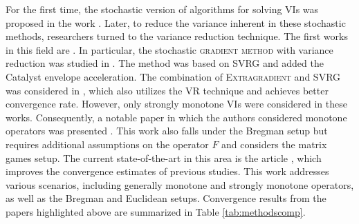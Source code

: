 \documentclass{article}
\begin{document}
For the first time, the stochastic version of algorithms for solving VIs was proposed in the work \citep{juditsky2011solving}. Later, to reduce the variance inherent in these stochastic methods, researchers turned to the variance reduction technique. The first works in this field are \citep{palaniappan2016stochastic, chavdarova2019reducing}. In particular, the stochastic \textsc{gradient method} with variance reduction was studied in \citep{palaniappan2016stochastic}. The method was based on \textsc{SVRG} \citep{johnson2013accelerating} and added the Catalyst envelope acceleration. The combination of \textsc{Extragradient} and \textsc{SVRG} was considered in \citep{chavdarova2019reducing}, which also utilizes the VR technique and achieves better convergence rate. However, only strongly monotone VIs were considered in these works. Consequently, a notable paper in which the authors considered monotone operators was presented \citep{carmon2019variance}. This work also falls under the Bregman setup but requires additional assumptions on the operator $F$
and considers the matrix games setup. The current state-of-the-art in this area is the article \citep{alacaoglu2022stochastic}, which improves the convergence estimates of previous studies. This work addresses various scenarios, including generally monotone and strongly monotone operators, as well as the Bregman and Euclidean setups.
Convergence results from the papers highlighted above are summarized in Table \ref{tab:methodscomp}.
\end{document}
